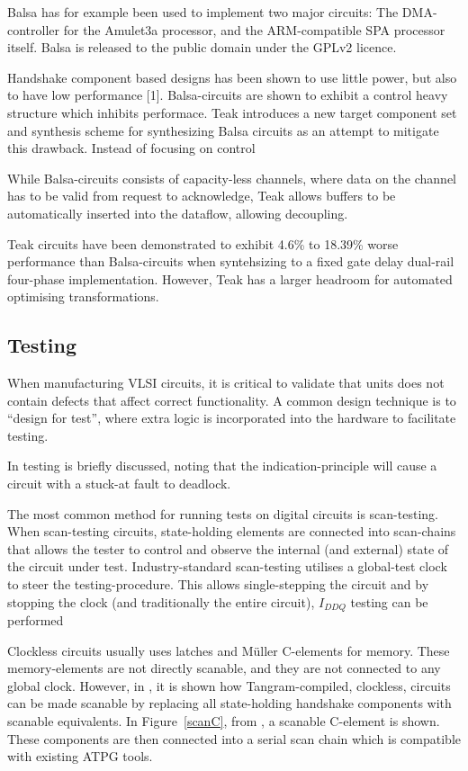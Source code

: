 Balsa has for example been used to implement two major circuits: The
DMA-controller for the Amulet3a processor, and the ARM-compatible SPA
processor itself. Balsa is released to the public domain under the
GPLv2 licence.

Handshake component based designs has been shown to use little power,
but also to have low performance [1]. Balsa-circuits are shown to
exhibit a control heavy structure which inhibits performace. Teak
introduces a new target component set and synthesis scheme for
synthesizing Balsa circuits as an attempt to mitigate this
drawback. Instead of focusing on control


While Balsa-circuits consists of capacity-less channels, where data on
the channel has to be valid from request to acknowledge, Teak allows
buffers to be automatically inserted into the dataflow, allowing
decoupling. 


Teak circuits have been demonstrated to exhibit 4.6\% to 18.39\% worse
performance than Balsa-circuits when syntehsizing to a fixed gate
delay dual-rail four-phase implementation. However, Teak has a larger
headroom for automated optimising transformations.

\subsection{Testing}

When manufacturing VLSI circuits, it is critical to validate that
units does not contain defects that affect correct functionality. A
common design technique is to ``design for test'', where extra logic
is incorporated into the hardware to facilitate testing.

In \cite[pp. 27-28]{sparso} testing is briefly discussed, noting that
the indication-principle will cause a circuit with a stuck-at fault to
deadlock.

The most common method for running tests on digital circuits is
scan-testing. When scan-testing circuits, state-holding elements are
connected into scan-chains that allows the tester to control and
observe the internal (and external) state of the circuit under
test. Industry-standard scan-testing utilises a global-test clock to
steer the testing-procedure. This allows single-stepping the circuit
and by stopping the clock (and traditionally the entire circuit),
$I_{DDQ}$ testing can be performed

Clockless circuits usually uses latches and Müller C-elements for
memory. These memory-elements are not directly scanable, and they are
not connected to any global clock. However, in \cite{fullscan}, it is
shown how Tangram-compiled, clockless, circuits can be made scanable
by replacing all state-holding handshake components with scanable
equivalents. In Figure~\ref{scanC}, from \cite{fullscan}, a scanable
C-element is shown. These components are then connected into a serial scan
chain which is compatible with existing ATPG tools.

